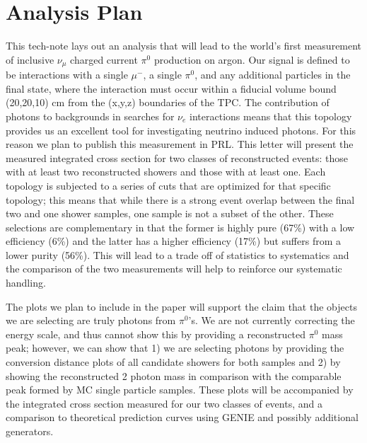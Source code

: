 \documentclass{article}
\begin{document}
\section{ Analysis Plan }
This tech-note lays out an analysis that will lead to the world's first measurement of inclusive $\nu_\mu$ charged current $\pi^0$ production on argon. Our signal is defined to be interactions with a single $\mu^-$, a single $\pi^0$, and any additional particles in the final state, where the interaction must occur within a fiducial volume bound (20,20,10) cm from the (x,y,z) boundaries of the TPC. The contribution of photons to backgrounds in searches for $\nu_{e}$ interactions means that this topology provides us an excellent tool for investigating neutrino induced photons. For this reason we plan to publish this measurement in PRL. This letter will present the measured integrated cross section for two classes of reconstructed events: those with at least two reconstructed showers and those with at least one.  Each topology is subjected to a series of cuts that are optimized for that specific topology; this means that while there is a strong event overlap between the final two and one shower samples, one sample is not a subset of the other.  These selections are complementary in that the former is highly pure (67\%)  with a low efficiency (6\%) and the latter has a higher efficiency (17\%) but suffers from a lower purity (56\%). This will lead to a trade off of statistics to systematics and the comparison of the two measurements will help to reinforce our systematic handling. 
\par The plots we plan to include in the paper will support the claim that the objects we are selecting are truly photons from $\pi^0$'s. We are not currently correcting the energy scale, and thus cannot show this by providing a reconstructed $\pi^0$ mass peak; however, we can show that 1) we are selecting photons by providing the conversion distance plots of all candidate showers for both samples and 2) by showing the reconstructed 2 photon mass in comparison with the comparable peak formed by MC single particle samples. These plots will be accompanied by the integrated cross section measured for our two classes of events, and a comparison to theoretical prediction curves using GENIE and possibly additional generators.
\end{document}
